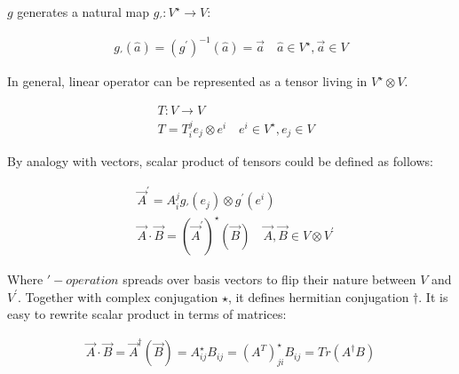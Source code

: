 $g$ generates a natural map $g_\prime: V^\star \rightarrow V$:

\begin{align}
    g_\prime(\hat{a}) = (g^\prime)^{-1}(\hat{a}) = \vec{a} \quad \hat{a} \in V^\star, \vec{a} \in V
\end{align}

In general, linear operator can be represented as a tensor
living in $V^\star \otimes V$.

\begin{align}
        &T: V \rightarrow V \\
        &T = T_i^j e_j \otimes e^i \quad e^i \in V^\star, e_j \in V 
\end{align}

By analogy with vectors, scalar product of tensors could be defined as follows:

\begin{align}
        &\vec{A}^\prime = A_i^j g_\prime(e_j) \otimes g^\prime(e^i) \\ 
        &\vec{A} \cdot \vec{B} = (\vec{A}^\prime)^\star(\vec{B}) \quad \vec{A}, \vec{B} \in V \otimes V^\prime
\end{align}

Where $\prime-operation$ spreads over basis vectors to flip their nature
between $V$ and $V^\prime$. Together with complex conjugation $\star$, it
defines hermitian conjugation $\dagger$. It is easy to rewrite
scalar product in terms of matrices:

\begin{align}
    \vec{A} \cdot \vec{B} = \vec{A}^\dagger (\vec{B}) = A_{ij}^\star B_{ij} = (A^T)^\star_{j i} B_{ij} = Tr(A^\dagger B)
\end{align}

